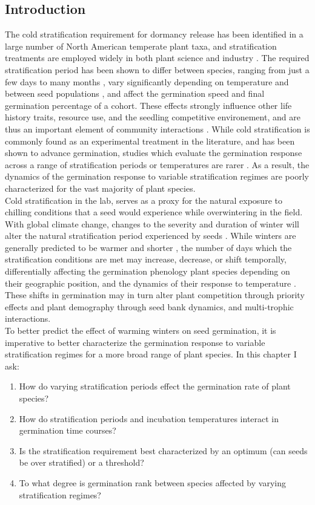 \documentclass{article}\usepackage[]{graphicx}\usepackage[]{color}
\begin{document}
\subsection*{Introduction}
\indent\indent The cold stratification requirement for dormancy release has been identified in a large number of North American temperate plant taxa, and stratification treatments are employed widely in both plant science and industry \citep{Hartmann_2011}. The required stratification period has been shown to differ between species, ranging from just a few days to many months \citep{Luna2009}, vary significantly depending on temperature and between seed populations \citep{Steadman2004}, and affect the germination speed and final germination percentage of a cohort. These effects strongly influence other life history traits, resource use, and the seedling competitive environement, and are thus an important element of community interactions \citep{Korner2008}.  While cold stratification is commonly found as an experimental treatment in the literature, and has been shown to advance germination, studies which evaluate the germination response across a range of stratification periods or temperatures are rarer \citep{Batlla2009}. As a result, the dynamics of the germination response to variable stratification regimes are poorly characterized for the vast majority of plant species.\\
\indent Cold stratification in the lab, serves as a proxy for the natural exposure to chilling conditions that a seed would experience while overwintering in the field. With global climate change, changes to the severity and duration of winter will alter the natural stratification period experienced by seeds \citep{Walck2011}. While winters are generally predicted to be warmer and shorter \citep{IPCC_2014}, the number of days which the stratification conditions are met may increase, decrease, or shift temporally, differentially affecting the germination phenology plant species depending on their geographic position, and the dynamics of their response to temperature \citep{Walck2011}. These shifts in germination may in turn alter plant competition through priority effects \citep{Gioria2018} and plant demography through seed bank dynamics, and multi-trophic interactions.\\
\indent To better predict the effect of warming winters on seed germination, it is imperative to better characterize the germination response to variable stratification regimes for a more broad range of plant species. In this chapter I ask:
\begin{enumerate}
\item How do varying stratification periods effect the germination rate of plant species?
\item How do stratification periods and incubation temperatures interact in germination time courses?
\item Is the stratification requirement best characterized by an optimum (can seeds be over stratified) or a threshold?
\item To what degree is germination rank between species affected by varying stratification regimes?
\end{enumerate}
\end{document}
